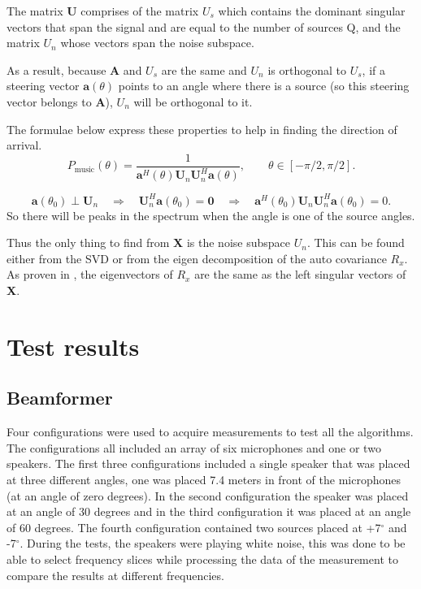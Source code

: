 The matrix \textbf{U} comprises of the matrix \textbf{$U_s$} which contains the dominant singular vectors that span the signal and are equal to the number of sources Q, and the matrix \textbf{$U_n$} whose vectors span the noise subspace.

As a result, because \textbf{A} and \textbf{$U_s$} are the same and \textbf{$U_n$} is orthogonal to \textbf{$U_s$}, if a steering vector $\mathbf{a}(\theta)$ points to an angle where there is a source (so this steering vector belongs to \textbf{A}), \textbf{$U_n$} will be orthogonal to it.


The formulae below express these properties to help in finding the direction of arrival.
$$
P_{\text{music}}(\theta) = \frac{1}{\mathbf{a}^H(\theta)\mathbf{U}_n\mathbf{U}_n^H\mathbf{a}(\theta)}, \qquad \theta \in [-\pi/2, \pi/2].
$$

$$
\mathbf{a}(\theta_0) \perp \mathbf{U}_n \quad \Rightarrow \quad \mathbf{U}_n^H\mathbf{a}(\theta_0) = \mathbf{0} \quad \Rightarrow \quad \mathbf{a}^H(\theta_0)\mathbf{U}_n\mathbf{U}_n^H\mathbf{a}(\theta_0) = 0.
$$
So there will be peaks in the spectrum when the angle is one of the source angles.

Thus the only thing to find from \textbf{X} is the noise subspace \textbf{$U_n$}. This can be found either from the SVD or from the eigen decomposition of the auto covariance $R_x$. As proven in \cite{IP3Man}, the eigenvectors of $R_x$ are the same as the left singular vectors of \textbf{X}.

\section{Test results}
\subsection{Beamformer}
\label{beamformer_testing}
Four configurations were used to acquire measurements to test all the algorithms. The configurations all included an array of six microphones and one or two speakers.  The first three configurations included a single speaker that was placed at three different angles, one was placed 7.4 meters in front of the microphones (at an angle of zero degrees). In the second configuration the speaker was placed at an angle of 30 degrees and in the third configuration it was placed at an angle of 60 degrees. The fourth configuration contained two sources placed at +7$^\circ$ and -7$^\circ$. During the tests, the speakers were playing white noise, this was done to be able to select frequency slices while processing the data of the measurement to compare the results at different frequencies.


